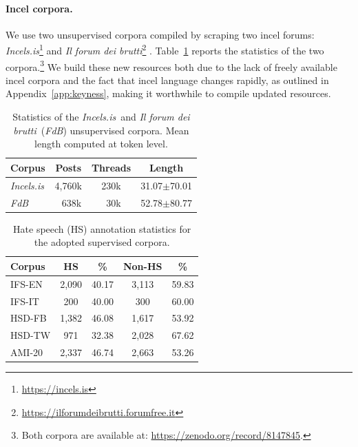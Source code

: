 \documentclass[11pt]{article}
\newcommand{\dsENclassification}{IFS-EN}
\newcommand{\dsITclassification}{IFS-IT}
\newcommand{\hsdfb}{\mbox{HSD-FB}}
\newcommand{\hsdtw}{\mbox{HSD-TW}}
\newcommand{\ami}{\mbox{AMI-20}}
\newcommand{\enforum}{\textit{Incels.is}}
\newcommand{\itforum}{\textit{Il forum dei brutti}}
\begin{document}
\paragraph{Incel corpora.}
We use two unsupervised corpora compiled by scraping two incel forums: \textit{\enforum}\footnote{\url{https://incels.is}} and \textit{\itforum}\footnote{\url{https://ilforumdeibrutti.forumfree.it}} \cite{gajo2023identification}.
Table~\ref{tab:english-italian-unsupervised-datasets-stats} reports the statistics of the two corpora.\footnote{Both corpora are available at: \url{https://zenodo.org/record/8147845}.} We build these new resources both due to the lack of freely available incel corpora and the fact that incel language changes rapidly, as outlined in Appendix~\ref{app:keyness}, making it worthwhile to compile updated resources.

\renewcommand{\arraystretch}{0.9}

\begin{table}[t]
  \centering
  \caption{Statistics of the \enforum\, and \itforum\, (\textit{FdB}) unsupervised corpora. Mean length computed at token level.}
  \begin{tabular}{l|ccc}
      \hline
      \textbf{Corpus} & \textbf{Posts} & \textbf{Threads} & \textbf{Length} \\
      \hline
      \enforum & 4,760k & 230k & 31.07$\pm$70.01 \\
      \textit{FdB} & \,\,\,\,638k & \,\,\,30k & 52.78$\pm$80.77 \\
      \hline
  \end{tabular}
  \label{tab:english-italian-unsupervised-datasets-stats}
\end{table}

\begin{table}[t]
  \caption{Hate speech (HS) annotation statistics for the adopted supervised corpora.}
  \label{tab:english-italian-supervised-datasets-partition-stats}
  \centering
  \begin{tabular}{l|cc|cc}
  \hline
  \bf Corpus                          & \bf HS & \bf \% & \bf Non-HS & \bf \%  \\ 
  \hline
  \dsENclassification                 	&  2,090 & 40.17  &   3,113    &  59.83 \\ 
  \dsITclassification                   &  200   & 40.00  &   300      &  60.00 \\ 
  \hsdfb                              	&  1,382 & 46.08  &   1,617    &  53.92 \\ 
  \hsdtw                              	&  971   & 32.38  &   2,028    &  67.62 \\ 
  \ami\,                                	&  2,337 & 46.74  &   2,663    &  53.26 \\ 
  \hline
  \end{tabular}
\end{table}
\end{document}
